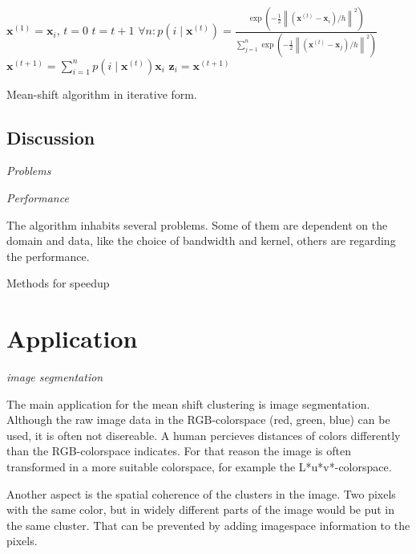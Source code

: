 \documentclass{article}
\newcommand{\norm}[1]{\left\lVert#1\right\rVert}
\begin{document}
\begin{algorithm}
	\begin{algorithmic}[1]
		\State $\bm{x}^{(1)} = \bm{x}_i$, $t=0$
		\Repeat
		\State $t = t + 1$
		\State $\forall n: p(i \mid \bm{x}^{(t)}) = \frac{\exp(-\frac{1}{2} \norm{(\bm{x}^{(t)} - \bm{x}_i) / h}^2)}{\sum_{j=1}^n \exp(-\frac{1}{2} \norm{(\bm{x}^{(t)} - \bm{x}_j) / h }^2)}$
		\State $\bm{x}^{(t+1)} = \sum_{i=1}^n p(i \mid \bm{x}^{(t)}) \bm{x}_i$
		\Until{$\norm{\bm{x}^{(t+1)} - \bm{x}^{(t)}} < tol$}
		\State $\bm{z}_i = \bm{x}^{(t+1)}$
		\EndFor
		\State \Return {}
		\EndFunction
	\end{algorithmic}
	\caption{Mean-shift algorithm in iterative form.}
	\label{alg:mean-shift-algorithm-iterative-form}
\end{algorithm}


\subsection{Discussion}

\textit{Problems}

\textit{Performance}

The algorithm inhabits several problems. Some of them are dependent on the domain and data, like the choice of bandwidth and kernel, others are regarding the performance.

Methods for speedup

\section{Application}

\textit{image segmentation}

The main application for the mean shift clustering is image segmentation. Although the raw image data in the RGB-colorspace (red, green, blue) can be used, it is often not disereable. A human percieves distances of colors differently than the RGB-colorspace indicates. For that reason the image is often transformed in a more suitable colorspace, for example the L*u*v*-colorspace.

Another aspect is the spatial coherence of the clusters in the image. Two pixels with the same color, but in widely different parts of the image would be put in the same cluster. That can be prevented by adding imagespace information to the pixels. 
\end{document}
